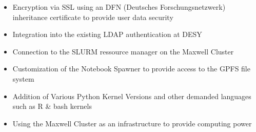 \documentclass[10pt]{scrartcl}
\begin{document}
\begin{itemize}
 \item Encryption via SSL using an DFN (Deutsches Forschungsnetzwerk) inheritance certificate to provide user data security
 \item Integration into the existing LDAP authentication at DESY
 \item Connection to the SLURM ressource manager on the Maxwell Cluster
 \item Customization of the Notebook Spawner to provide access to the GPFS file system
 \item Addition of Various Python Kernel Versions and other demanded languages such as R \& bash kernels
 \item Using the Maxwell Cluster as an infrastructure to provide computing power
\end{itemize}
%
\end{document}
